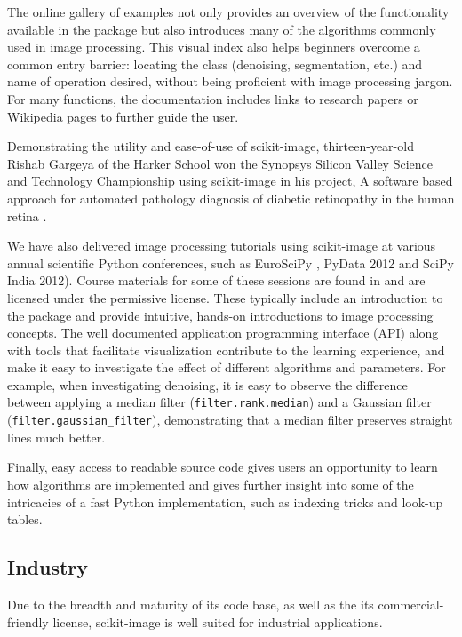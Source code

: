\documentclass[fleqn,12pt]{wlpeerj}
\begin{document}
The online gallery of examples not only provides
an overview of the functionality available in the package but also
introduces many of the algorithms commonly used in image processing.
This visual index also helps beginners overcome a common entry barrier:
locating the class (denoising, segmentation, etc.) and name of operation
desired, without being proficient with image processing jargon.  For many
functions, the documentation includes links to research papers or Wikipedia
pages to further guide the user.

Demonstrating the utility and ease-of-use of scikit-image, thirteen-year-old
Rishab Gargeya of the Harker School won the Synopsys Silicon
Valley Science and Technology Championship using scikit-image in
his project, \textquotedbl{}A software based approach for automated pathology diagnosis of
diabetic retinopathy in the human retina \citep{sciencefair}.

We have also delivered
image processing tutorials using scikit-image at various
annual scientific Python conferences, such as EuroSciPy \citep{euroscipy2013}, PyData
2012 \citep{pydata2012} and SciPy India
2012). Course materials for some of these sessions are found in
\citep{scipylecturenotes} and are licensed under the permissive \citep{cc-by}
license.  These typically include an introduction to the package and provide
intuitive, hands-on introductions to image processing concepts. The well
documented application programming interface (API) along with tools that
facilitate visualization contribute to the learning experience, and make it
easy to investigate the effect of different algorithms and parameters.
For example, when investigating denoising, it is easy to observe the difference
between applying a median filter (\texttt{filter.rank.median}) and a
Gaussian filter (\texttt{filter.gaussian\_filter}),
demonstrating that a median filter preserves straight lines much better.

Finally, easy access to readable source code gives users an opportunity to
learn how algorithms are implemented and gives further insight into some of the
intricacies of a fast Python implementation, such as indexing tricks
and look-up tables.

\subsection*{Industry}
  \label{industry}

Due to the breadth and maturity of its code base, as well as the its
commercial-friendly license, scikit-image is well suited for
industrial applications.
\end{document}
